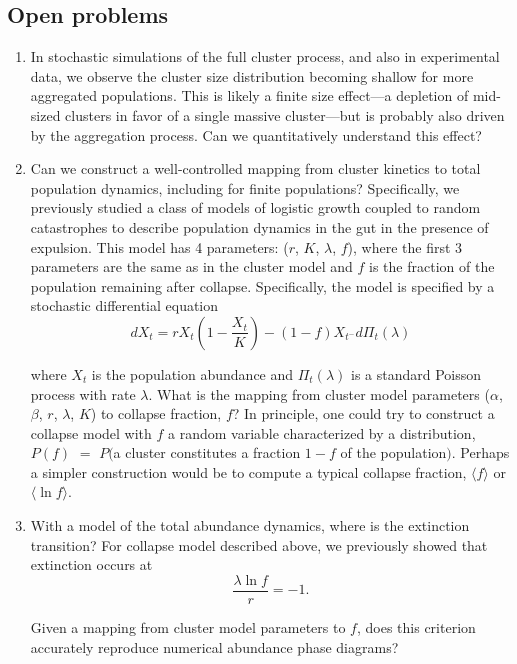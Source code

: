 \documentclass[12pt]{article}
\def\be{\begin{equation}}
\def\ee{\end{equation}}
\begin{document}
\subsection*{Open problems}
\begin{enumerate}
	\item 
	In stochastic simulations of the full cluster process, and also in experimental data, we observe the cluster size distribution becoming shallow for more aggregated populations. This is likely a finite size effect---a depletion of mid-sized clusters in favor of a single massive cluster---but is probably also driven by the aggregation process. Can we quantitatively understand this effect?
	\item 
	Can we construct a well-controlled mapping from cluster kinetics to total population dynamics, including for finite populations? Specifically, we previously studied a class of models of logistic growth coupled to random catastrophes to describe population dynamics in the gut in the presence of expulsion. This model has 4 parameters: ($r$, $K$, $\lambda$, $f$), where the first 3 parameters are the same as in the cluster model and $f$ is the fraction of the population remaining after collapse. Specifically, the model is specified by a stochastic differential equation 
	\be
		dX_t = rX_t\left(1-\frac{X_t}{K}\right) - (1-f)X_{t^{-}}d\Pi_t(\lambda)
	\ee
	
	\noindent where $X_t$ is the population abundance and $\Pi_t(\lambda)$ is a standard Poisson process with rate $\lambda$. What is the mapping from cluster model parameters ($\alpha$, $\beta$, $r$, $\lambda$, $K$) to collapse fraction, $f$? In principle, one could try to construct a collapse model with $f$ a random variable characterized by a distribution, $P(f)$ $=$ $P($a cluster constitutes a fraction $1-f$ of the population$)$. Perhaps a simpler construction would be to compute a typical collapse fraction, $\langle f \rangle$ or $\langle \ln f \rangle$. 
	
	\item 
	With a model of the total abundance dynamics, where is the extinction transition? For collapse model described above, we previously showed that extinction occurs at
	\be
		\frac{\lambda\ln f}{r} = -1.
	\ee
	
	\noindent Given a mapping from cluster model parameters to $f$, does this criterion accurately reproduce numerical abundance phase diagrams?
	
\end{enumerate}
\end{document}
